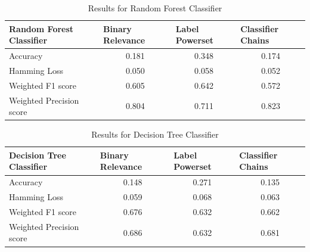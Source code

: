 \begin{table}[!htb]
    \centering
    \begin{tabular}{|l|c|c|c|}
\hline
Random Forest Classifier & \multicolumn{1}{l|}{Binary Relevance} & \multicolumn{1}{l|}{Label Powerset} & \multicolumn{1}{l|}{Classifier Chains} \\ \hline
Accuracy                 & 0.181                                 & 0.348                               & 0.174                                  \\ \hline
Hamming Loss             & 0.050                                 & 0.058                               & 0.052                                  \\ \hline
Weighted F1 score        & 0.605                                 & 0.642                               & 0.572                                  \\ \hline
Weighted Precision score & 0.804                                 & 0.711                               & 0.823                                  \\ \hline
\end{tabular}
    \caption{Results for Random Forest Classifier}
    \label{tab:randomforest}
\end{table}

\begin{table}[!htb]
    \centering
\begin{tabular}{|l|c|c|c|}
\hline
Decision Tree Classifier    & \multicolumn{1}{l|}{Binary Relevance} & \multicolumn{1}{l|}{Label Powerset} & \multicolumn{1}{l|}{Classifier Chains} \\ \hline
Accuracy                 & 0.148                                 & 0.271                               & 0.135                                  \\ \hline
Hamming Loss             & 0.059                                 & 0.068                               & 0.063                                  \\ \hline
Weighted F1 score        & 0.676                                 & 0.632                               & 0.662                                  \\ \hline
Weighted Precision score & 0.686                                 & 0.632                               & 0.681                                  \\ \hline
\end{tabular}
    \caption{Results for Decision Tree Classifier}
    \label{tab:decisiontree}
\end{table}

